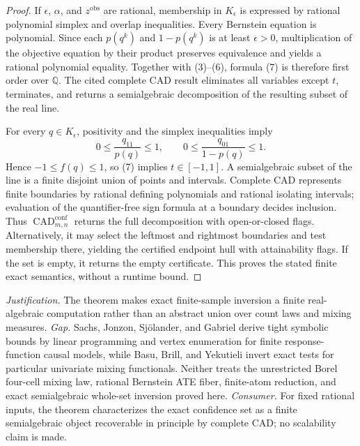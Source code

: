 \documentclass{article}
\begin{document}
\begin{proof}
If \(\epsilon\), \(\alpha\), and \(z^{\mathrm{obs}}\) are rational, membership in \(K_{\epsilon}\) is expressed by rational polynomial simplex and overlap inequalities.  Every Bernstein equation is polynomial.  Since each \(p(q^k)\) and \(1-p(q^k)\) is at least \(\epsilon>0\), multiplication of the objective equation by their product preserves equivalence and yields a rational polynomial equality.  Together with (3)--(6), formula (7) is therefore first order over \(\mathbb Q\).  The cited complete CAD result eliminates all variables except \(t\), terminates, and returns a semialgebraic decomposition of the resulting subset of the real line.

For every \(q\in K_{\epsilon}\), positivity and the simplex inequalities imply
\[
 0\leq\frac{q_{11}}{p(q)}\leq1,
 \qquad 0\leq\frac{q_{01}}{1-p(q)}\leq1.
\]
Hence \(-1\leq f(q)\leq1\), so (7) implies \(t\in[-1,1]\).  A semialgebraic subset of the line is a finite disjoint union of points and intervals.  Complete CAD represents finite boundaries by rational defining polynomials and rational isolating intervals; evaluation of the quantifier-free sign formula at a boundary decides inclusion.  Thus \(\operatorname{CAD}^{\mathrm{conf}}_{m,n}\) returns the full decomposition with open-or-closed flags.  Alternatively, it may select the leftmost and rightmost boundaries and test membership there, yielding the certified endpoint hull with attainability flags.  If the set is empty, it returns the empty certificate.  This proves the stated finite exact semantics, without a runtime bound.
\end{proof}
\par\smallskip\noindent \textit{Justification.} The theorem makes exact finite-sample inversion a finite real-algebraic computation rather than an abstract union over count laws and mixing measures. \textit{Gap.} Sachs, Jonzon, Sjölander, and Gabriel derive tight symbolic bounds by linear programming and vertex enumeration for finite response-function causal models, while Basu, Brill, and Yekutieli invert exact tests for particular univariate mixing functionals.  Neither treats the unrestricted Borel four-cell mixing law, rational Bernstein ATE fiber, finite-atom reduction, and exact semialgebraic whole-set inversion proved here. \textit{Consumer.} For fixed rational inputs, the theorem characterizes the exact confidence set as a finite semialgebraic object recoverable in principle by complete CAD; no scalability claim is made.
\end{document}
